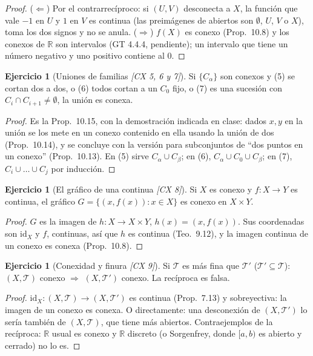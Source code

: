 \documentclass[11pt,a4paper]{article}
\theoremstyle{definition}
\newtheorem{ejercicio}[definicion]{Ejercicio}
\theoremstyle{plain}
\newcommand{\fnt}[1]{{\normalfont\small\itshape\color{gray!150!black}[#1]}}
\newcommand{\R}{\mathbb{R}}
\newcommand{\tp}{\mathcal{T}}
\begin{document}
\begin{proof}
($\Leftarrow$) Por el contrarrecíproco: si $(U,V)$ desconecta a $X$, la función que vale $-1$ en $U$ y $1$ en $V$ es continua (las preimágenes de abiertos son $\emptyset$, $U$, $V$ o $X$), toma los dos signos y no se anula. ($\Rightarrow$) $f(X)$ es conexo (Prop.\ 10.8) y los conexos de $\R$ son intervalos (GT 4.4.4, pendiente); un intervalo que tiene un número negativo y uno positivo contiene al $0$.
\end{proof}

\begin{ejercicio}[Uniones de familias \fnt{CX 5, 6 y 7}]
Si $\{C_\alpha\}$ son conexos y (5) se cortan dos a dos, o (6) todos cortan a un $C_0$ fijo, o (7) es una sucesión con $C_i\cap C_{i+1}\ne\emptyset$, la unión es conexa.
\end{ejercicio}

\begin{proof}
Es la Prop.\ 10.15, con la demostración indicada en clase: dados $x,y$ en la unión se los mete en un conexo contenido en ella usando la unión de dos (Prop.\ 10.14), y se concluye con la versión para subconjuntos de ``dos puntos en un conexo'' (Prop.\ 10.13). En (5) sirve $C_\alpha\cup C_\beta$; en (6), $C_\alpha\cup C_0\cup C_\beta$; en (7), $C_i\cup\dots\cup C_j$ por inducción.
\end{proof}

\begin{ejercicio}[El gráfico de una continua \fnt{CX 8}]
Si $X$ es conexo y $f:X\to Y$ es continua, el gráfico $G=\{(x,f(x)): x\in X\}$ es conexo en $X\times Y$.
\end{ejercicio}

\begin{proof}
$G$ es la imagen de $h:X\to X\times Y$, $h(x)=(x,f(x))$. Sus coordenadas son $\mathrm{id}_X$ y $f$, continuas, así que $h$ es continua (Teo.\ 9.12), y la imagen continua de un conexo es conexa (Prop.\ 10.8).
\end{proof}

\begin{ejercicio}[Conexidad y finura \fnt{CX 9}]
Si $\tp$ es más fina que $\tp'$ ($\tp'\subseteq\tp$): $(X,\tp)$ conexo $\Rightarrow$ $(X,\tp')$ conexo. La recíproca es falsa.
\end{ejercicio}

\begin{proof}
$\mathrm{id}_X:(X,\tp)\to(X,\tp')$ es continua (Prop.\ 7.13) y sobreyectiva: la imagen de un conexo es conexa. O directamente: una desconexión de $(X,\tp')$ lo sería también de $(X,\tp)$, que tiene más abiertos. Contraejemplos de la recíproca: $\R$ usual es conexo y $\R$ discreto (o Sorgenfrey, donde $[a,b)$ es abierto y cerrado) no lo es.
\end{proof}
\end{document}
